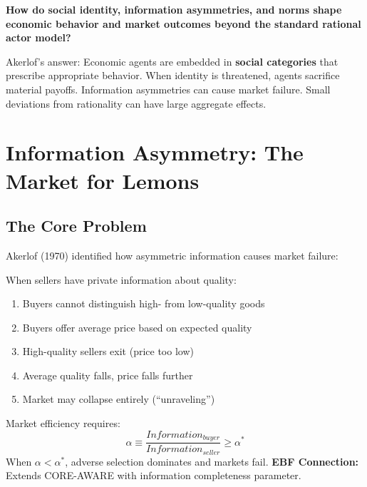 \begin{tcolorbox}[colback=red!5!white, colframe=red!75!black, title=Central Question]
\textbf{How do social identity, information asymmetries, and norms shape economic behavior and market outcomes beyond the standard rational actor model?}
\end{tcolorbox}

Akerlof's answer: Economic agents are embedded in \textbf{social categories} that prescribe appropriate behavior. When identity is threatened, agents sacrifice material payoffs. Information asymmetries can cause market failure. Small deviations from rationality can have large aggregate effects.

\section{Information Asymmetry: The Market for Lemons}

\subsection{The Core Problem}

Akerlof (1970) identified how asymmetric information causes market failure:

\begin{definition}
When sellers have private information about quality:
\begin{enumerate}
    \item Buyers cannot distinguish high- from low-quality goods
    \item Buyers offer average price based on expected quality
    \item High-quality sellers exit (price too low)
    \item Average quality falls, price falls further
    \item Market may collapse entirely (``unraveling'')
\end{enumerate}
\end{definition}

\begin{axiom}
\label{ax:ga1}
Market efficiency requires:
\begin{equation}
\alpha \equiv \frac{Information_{buyer}}{Information_{seller}} \geq \alpha^*
\end{equation}
When $\alpha < \alpha^*$, adverse selection dominates and markets fail.
\textbf{EBF Connection:} Extends CORE-AWARE with information completeness parameter.
\end{axiom}

